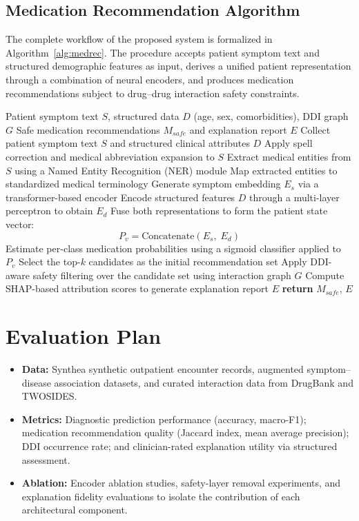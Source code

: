 \subsection{Medication Recommendation Algorithm}
The complete workflow of the proposed system is formalized in Algorithm~\ref{alg:medrec}. The procedure accepts patient symptom text and structured demographic features as input, derives a unified patient representation through a combination of neural encoders, and produces medication recommendations subject to drug--drug interaction safety constraints.

\begin{algorithm}
\caption{DL\_Medication\_Recommendation\_System}
\label{alg:medrec}
\begin{algorithmic}[1]
\REQUIRE Patient symptom text $S$, structured data $D$ (age, sex, comorbidities), DDI graph $G$
\ENSURE Safe medication recommendations $M_{safe}$ and explanation report $E$
\STATE Collect patient symptom text $S$ and structured clinical attributes $D$
\STATE Apply spell correction and medical abbreviation expansion to $S$
\STATE Extract medical entities from $S$ using a Named Entity Recognition (NER) module
\STATE Map extracted entities to standardized medical terminology
\STATE Generate symptom embedding $E_s$ via a transformer-based encoder
\STATE Encode structured features $D$ through a multi-layer perceptron to obtain $E_d$
\STATE Fuse both representations to form the patient state vector:
\[
P_v = \text{Concatenate}(E_s,\; E_d)
\]
\STATE Estimate per-class medication probabilities using a sigmoid classifier applied to $P_v$
\STATE Select the top-$k$ candidates as the initial recommendation set
\STATE Apply DDI-aware safety filtering over the candidate set using interaction graph $G$
\STATE Compute SHAP-based attribution scores to generate explanation report $E$
\STATE \textbf{return} $M_{safe}$, $E$
\end{algorithmic}
\end{algorithm}

\section{Evaluation Plan}
\begin{itemize}
    \item \textbf{Data:} Synthea synthetic outpatient encounter records, augmented symptom--disease association datasets, and curated interaction data from DrugBank and TWOSIDES.
    \item \textbf{Metrics:} Diagnostic prediction performance (accuracy, macro-F1); medication recommendation quality (Jaccard index, mean average precision); DDI occurrence rate; and clinician-rated explanation utility via structured assessment.
    \item \textbf{Ablation:} Encoder ablation studies, safety-layer removal experiments, and explanation fidelity evaluations to isolate the contribution of each architectural component.
\end{itemize}

